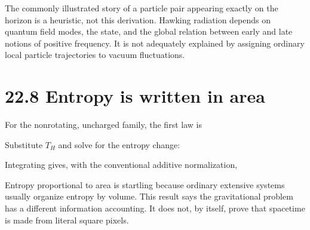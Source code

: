 \documentclass[
  11pt,
  letterpaper,
  oneside,
  openany]{scrbook}
\begin{document}
The commonly illustrated story of a particle pair appearing exactly on
the horizon is a heuristic, not this derivation. Hawking radiation
depends on quantum field modes, the state, and the global relation
between early and late notions of positive frequency. It is not
adequately explained by assigning ordinary local particle trajectories
to vacuum fluctuations.

\hypertarget{entropy-is-written-in-area}{%
\section{22.8 Entropy is written in
area}\label{entropy-is-written-in-area}}

For the nonrotating, uncharged family, the first law is

\begin{center}
\begingroup
{}
\ifdim\wd\grmathbox>\linewidth
\resizebox{\linewidth}{!}{\usebox{\grmathbox}}
\else\usebox{\grmathbox}\fi
\endgroup
\end{center}

Substitute \(T_H\) and solve for the entropy change:

\begin{center}
\begingroup
{}
\ifdim\wd\grmathbox>\linewidth
\resizebox{\linewidth}{!}{\usebox{\grmathbox}}
\else\usebox{\grmathbox}\fi
\endgroup
\end{center}

Integrating gives, with the conventional additive normalization,

\begin{center}
\begingroup
{}
\ifdim\wd\grmathbox>\linewidth
\resizebox{\linewidth}{!}{\usebox{\grmathbox}}
\else\usebox{\grmathbox}\fi
\endgroup
\end{center}

Entropy proportional to area is startling because ordinary extensive
systems usually organize entropy by volume. This result says the
gravitational problem has a different information accounting. It does
not, by itself, prove that spacetime is made from literal square pixels.
\end{document}
